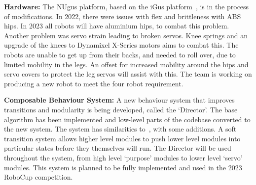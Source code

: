 \documentclass{llncs}
\begin{document}
\noindent\textbf{Hardware:}
The NUgus platform, based on the iGus platform~\cite{Nimbro2018TDP}, is in the process of modifications. In 2022, there were issues with flex and brittleness with ABS hips. In 2023 all robots will have aluminium hips, to combat this problem. Another problem was servo strain leading to broken servos. Knee springs and an upgrade of the knees to Dynamixel X-Series motors aims to combat this. The robots are unable to get up from their backs, and needed to roll over, due to limited mobility in the legs. An offset for increased mobility around the hips and servo covers to protect the leg servos will assist with this. The team is working on producing a new robot to meet the four robot requirement.\newline

\noindent\textbf{Composable Behaviour System:}
A new behaviour system that improves transitions and modularity is being developed, called the `Director'. The base algorithm has been implemented and low-level parts of the codebase converted to the new system. The system has similarities to~\cite{Poppinga2022}, with some additions. A soft transition system allows higher level modules to push lower level modules into particular states before they themselves will run. The Director will be used throughout the system, from high level `purpose' modules to lower level `servo' modules. This system is planned to be fully implemented and used in the 2023 RoboCup competition.\newline




\end{document}
